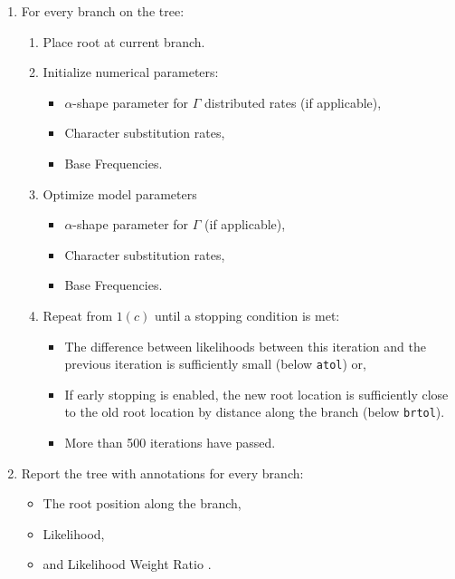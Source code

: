 \documentclass{article}
\begin{document}
\begin{enumerate}
    \item For every branch on the tree:
    \begin{enumerate}
      \item Place root at current branch.
      \item Initialize numerical parameters:
                \begin{itemize}
                  \item $\alpha$-shape parameter for $\Gamma$ distributed rates
                    (if applicable),
                  \item Character substitution rates,
                  \item Base Frequencies.
                \end{itemize}
          \item Optimize model parameters
                \begin{itemize}
                  \item $\alpha$-shape parameter for $\Gamma$ (if applicable),
                  \item Character substitution rates,
                  \item Base Frequencies.
                \end{itemize}
          \item Repeat from $1(c)$ until a stopping condition is met:
                \begin{itemize}
                  \item The difference between likelihoods between this
                        iteration and the previous iteration is sufficiently
                        small (below \texttt{atol}) or,
                  \item If early stopping is enabled, the new root location is
                        sufficiently close to the old root location by distance
                        along the branch (below \texttt{brtol}).
                  \item More than 500 iterations have passed.
                \end{itemize}
    \end{enumerate}
  \item Report the tree with annotations for every branch:
    \begin{itemize}
      \item The root position along the branch,
      \item Likelihood,
      \item and Likelihood Weight Ratio \cite{strimmer_inferring_2002}.
    \end{itemize}
\end{enumerate}
\end{document}
